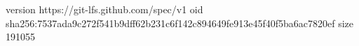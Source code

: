 version https://git-lfs.github.com/spec/v1
oid sha256:7537ada9c272f541b9dff62b231c6f142c894649fe913e45f40f5ba6ac7820ef
size 191055
